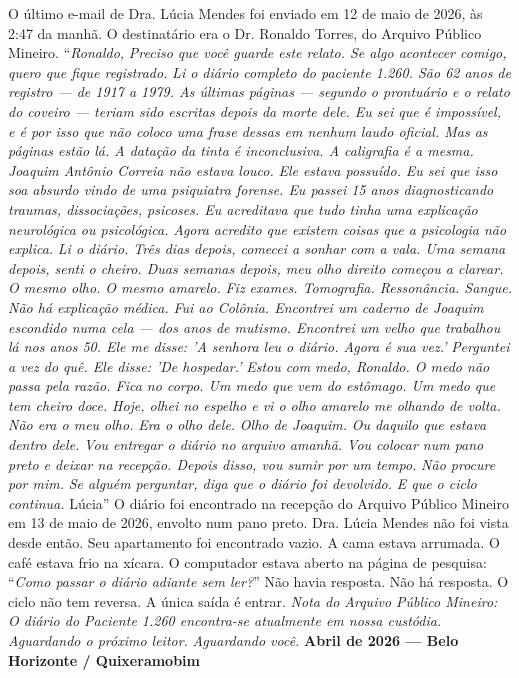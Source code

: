 \noindent O último e-mail de Dra. Lúcia Mendes foi enviado em 12 de maio de 2026, às 2:47 da manhã.
\noindent O destinatário era o Dr. Ronaldo Torres, do Arquivo Público Mineiro.
\noindent \textquotedblleft{\textit{Ronaldo,}}
\noindent \textit{Preciso que você guarde este relato. Se algo acontecer comigo, quero que fique registrado.}
\noindent \textit{Li o diário completo do paciente 1.260. São 62 anos de registro --- de 1917 a 1979. As últimas páginas --- segundo o prontuário e o relato do coveiro --- teriam sido escritas depois da morte dele. Eu sei que é impossível, e é por isso que não coloco uma frase dessas em nenhum laudo oficial. Mas as páginas estão lá. A datação da tinta é inconclusiva. A caligrafia é a mesma.}
\noindent \textit{Joaquim Antônio Correia não estava louco.}
\noindent \textit{Ele estava possuído.}
\noindent \textit{Eu sei que isso soa absurdo vindo de uma psiquiatra forense. Eu passei 15 anos diagnosticando traumas, dissociações, psicoses. Eu acreditava que tudo tinha uma explicação neurológica ou psicológica.}
\noindent \textit{Agora acredito que existem coisas que a psicologia não explica.}
\noindent \textit{Li o diário. Três dias depois, comecei a sonhar com a vala. Uma semana depois, senti o cheiro. Duas semanas depois, meu olho direito começou a clarear.}
\noindent \textit{O mesmo olho. O mesmo amarelo.}
\noindent \textit{Fiz exames. Tomografia. Ressonância. Sangue. Não há explicação médica.}
\noindent \textit{Fui ao Colônia. Encontrei um caderno de Joaquim escondido numa cela --- dos anos de mutismo. Encontrei um velho que trabalhou lá nos anos 50. Ele me disse: 'A senhora leu o diário. Agora é sua vez.'}
\noindent \textit{Perguntei a vez do quê. Ele disse: 'De hospedar.'}
\noindent \textit{Estou com medo, Ronaldo. O medo não passa pela razão. Fica no corpo. Um medo que vem do estômago. Um medo que tem cheiro doce.}
\noindent \textit{Hoje, olhei no espelho e vi o olho amarelo me olhando de volta.}
\noindent \textit{Não era o meu olho.}
\noindent \textit{Era o olho dele.}
\noindent \textit{Olho de Joaquim.}
\noindent \textit{Ou daquilo que estava dentro dele.}
\noindent \textit{Vou entregar o diário no arquivo amanhã. Vou colocar num pano preto e deixar na recepção. Depois disso, vou sumir por um tempo.}
\noindent \textit{Não procure por mim.}
\noindent \textit{Se alguém perguntar, diga que o diário foi devolvido.}
\noindent \textit{E que o ciclo continua.}
\noindent Lúcia\textquotedblright{}
\noindent O diário foi encontrado na recepção do Arquivo Público Mineiro em 13 de maio de 2026, envolto num pano preto.
\noindent Dra. Lúcia Mendes não foi vista desde então.
\noindent Seu apartamento foi encontrado vazio. A cama estava arrumada. O café estava frio na xícara. O computador estava aberto na página de pesquisa: \textquotedblleft{\textit{Como passar o diário adiante sem ler?}\textquotedblright}
\noindent Não havia resposta.
\noindent Não há resposta.
\noindent O ciclo não tem reversa.
\noindent A única saída é entrar.
\noindent \textit{Nota do Arquivo Público Mineiro:}
\noindent \textit{O diário do Paciente 1.260 encontra-se atualmente em nossa custódia.}
\noindent \textit{Aguardando o próximo leitor.}
\noindent \textit{Aguardando você.}
\noindent \textbf{Abril de 2026 --- Belo Horizonte / Quixeramobim}

